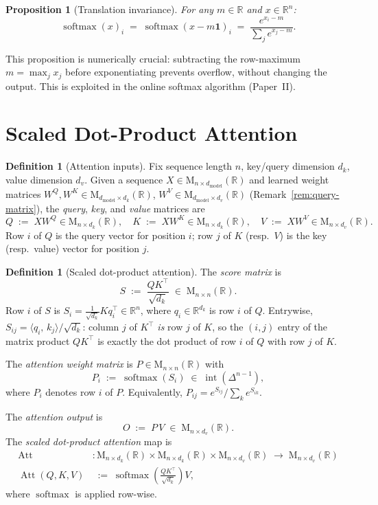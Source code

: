 \documentclass[11pt]{amsart}
\theoremstyle{plain}
\newtheorem{proposition}[theorem]{Proposition}
\theoremstyle{definition}
\newtheorem{definition}[theorem]{Definition}
\newcommand{\R}{\mathbb{R}}
\newcommand{\Mat}[2]{\mathrm{M}_{#1 \times #2}(\R)}
\newcommand{\simplex}[1]{\Delta^{#1}}   %
\newcommand{\softmax}{\operatorname{softmax}}
\newcommand{\Att}{\operatorname{Att}}
\newcommand{\inner}[2]{\langle #1,\, #2 \rangle}
\begin{document}
\begin{proposition}[Translation invariance]
\label{prop:softmax-shift}
For any $m \in \R$ and $x \in \R^n$:
\[
    \softmax(x)_i \;=\; \softmax(x - m\mathbf{1})_i
    \;=\; \frac{e^{x_i - m}}{\sum_j e^{x_j - m}}.
\]
\end{proposition}

This proposition is numerically crucial: subtracting the row-maximum $m =
\max_j x_j$ before exponentiating prevents overflow, without changing the
output.  This is exploited in the online softmax algorithm (Paper~II).

\section{Scaled Dot-Product Attention}
\label{sec:sdp-attention}

\begin{definition}[Attention inputs]
\label{def:attention-inputs}
Fix sequence length $n$, key/query dimension $d_k$, value dimension $d_v$.
Given a sequence $X \in \Mat{n}{d_{\mathrm{model}}}$ and learned weight
matrices $W^Q, W^K \in \Mat{d_{\mathrm{model}}}{d_k}$,
$W^V \in \Mat{d_{\mathrm{model}}}{d_v}$ (Remark~\ref{rem:query-matrix}),
the \emph{query}, \emph{key}, and \emph{value} matrices are
\[
    Q \;:=\; XW^Q \in \Mat{n}{d_k}, \quad
    K \;:=\; XW^K \in \Mat{n}{d_k}, \quad
    V \;:=\; XW^V \in \Mat{n}{d_v}.
\]
Row $i$ of $Q$ is the query vector for position $i$; row $j$ of $K$ (resp.\ $V$)
is the key (resp.\ value) vector for position $j$.
\end{definition}

\begin{definition}[Scaled dot-product attention]
\label{def:attention}
The \emph{score matrix} is
\[
    S \;:=\; \frac{Q K^\top}{\sqrt{d_k}} \;\in\; \Mat{n}{n}.
\]
Row $i$ of $S$ is $S_i = \frac{1}{\sqrt{d_k}} K q_i^\top \in \R^n$, where $q_i \in \R^{d_k}$ is row $i$ of $Q$.
Entrywise, $S_{ij} = \inner{q_i}{k_j}/\sqrt{d_k}$: column $j$ of $K^\top$
\emph{is} row $j$ of $K$, so the $(i,j)$ entry of the matrix product
$QK^\top$ is exactly the dot product of row $i$ of $Q$ with row $j$ of $K$.

The \emph{attention weight matrix} is $P \in \Mat{n}{n}$ with
\[
    P_i \;:=\; \softmax(S_i) \;\in\; \operatorname{int}(\simplex{n-1}),
\]
where $P_i$ denotes row $i$ of $P$.  Equivalently, $P_{ij} = e^{S_{ij}}/
\sum_k e^{S_{ik}}$.

The \emph{attention output} is
\[
    O \;:=\; P\,V \;\in\; \Mat{n}{d_v}.
\]
The \emph{scaled dot-product attention} map is
\begin{align*}
    \Att &: \Mat{n}{d_k} \times \Mat{n}{d_k} \times \Mat{n}{d_v}
           \;\longrightarrow\; \Mat{n}{d_v} \\
    \Att(Q,K,V) &\;:=\; \softmax\!\left(\frac{QK^\top}{\sqrt{d_k}}\right) V,
\end{align*}
where $\softmax$ is applied row-wise.
\end{definition}
\end{document}
